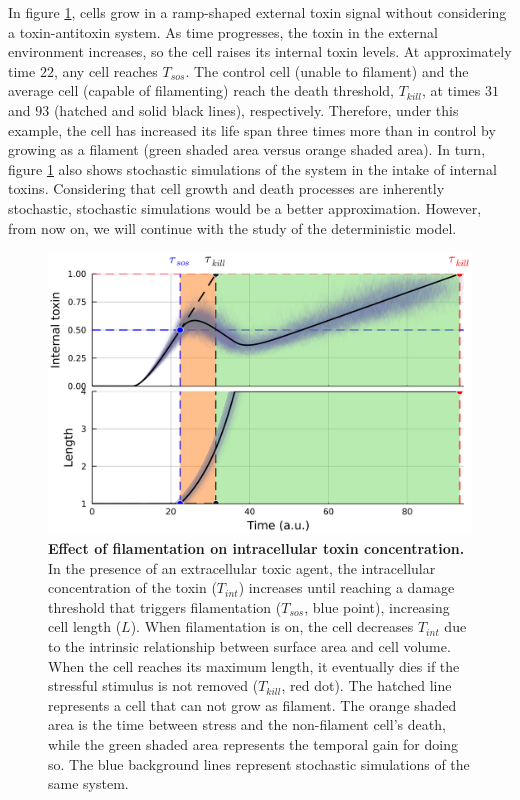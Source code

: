 \documentclass[a4paper, nobind]{templates/ociamthesis}
\begin{document}
In figure \ref{fig:filamentation-model-ramp-signal}, cells grow in a ramp-shaped external toxin signal without considering a toxin-antitoxin system.
As time progresses, the toxin in the external environment increases, so the cell raises its internal toxin levels.
At approximately time \(22\), any cell reaches \(T_{sos}\).
The control cell (unable to filament) and the average cell (capable of filamenting) reach the death threshold, \(T_{kill}\), at times \(31\) and \(93\) (hatched and solid black lines), respectively.
Therefore, under this example, the cell has increased its life span three times more than in control by growing as a filament (green shaded area versus orange shaded area).
In turn, figure \ref{fig:filamentation-model-ramp-signal} also shows stochastic simulations of the system in the intake of internal toxins.
Considering that cell growth and death processes are inherently stochastic, stochastic simulations would be a better approximation.
However, from now on, we will continue with the study of the deterministic model.





\begin{figure}[H]
\includegraphics[width=1\linewidth]{downloadFigs4latex__main/filamentation-model-ramp-signal} \caption[Effect of filamentation on intracellular toxin concentration.]{\textbf{Effect of filamentation on intracellular toxin concentration.} In the presence of an extracellular toxic agent, the intracellular concentration of the toxin (\(T_{int}\)) increases until reaching a damage threshold that triggers filamentation (\(T_{sos}\), blue point), increasing cell length (\(L\)). When filamentation is on, the cell decreases \(T_{int}\) due to the intrinsic relationship between surface area and cell volume. When the cell reaches its maximum length, it eventually dies if the stressful stimulus is not removed (\(T_{kill}\), red dot). The hatched line represents a cell that can not grow as filament. The orange shaded area is the time between stress and the non-filament cell's death, while the green shaded area represents the temporal gain for doing so. The blue background lines represent stochastic simulations of the same system.}\label{fig:filamentation-model-ramp-signal}
\end{figure}
\end{document}
